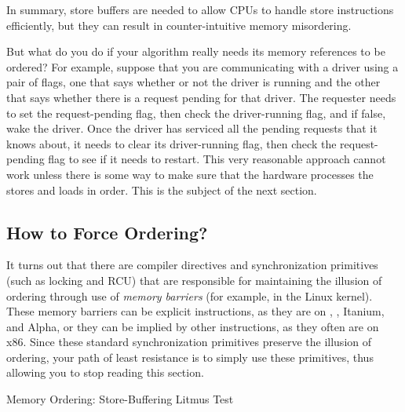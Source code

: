 \QuickQuizEnd

In summary, store buffers are needed to allow CPUs to handle
store instructions efficiently, but they can result in
counter-intuitive memory misordering.

But what do you do if your algorithm really needs its memory
references to be ordered?
For example, suppose that you are communicating with a driver using
a pair of flags, one that says whether or not the driver is running
and the other that says whether there is a request pending for that
driver.
The requester needs to set the request-pending flag, then check
the driver-running flag, and if false, wake the driver.
Once the driver has serviced all the pending requests that it knows about,
it needs to clear its driver-running flag, then check the request-pending
flag to see if it needs to restart.
This very reasonable approach cannot work unless there is some way
to make sure that the hardware processes the stores and loads in order.
This is the subject of the next section.

\subsection{How to Force Ordering?}
\label{sec:memorder:How to Force Ordering?}

It turns out that there are compiler directives and synchronization
primitives (such as locking and RCU) that are responsible for maintaining
the illusion of ordering through use of \emph{memory barriers} (for
example,  in the Linux kernel).
These memory barriers can be explicit instructions, as they are on
\ARM, \Power{}, Itanium, and Alpha, or they can be implied by other instructions,
as they often are on x86.
Since these standard synchronization primitives preserve the illusion of
ordering, your path of least resistance is to simply use these primitives,
thus allowing you to stop reading this section.

\begin{listing}

\caption{Memory Ordering: Store-Buffering Litmus Test}
\label{lst:memorder:Memory Ordering: Store-Buffering Litmus Test}
\end{listing}

